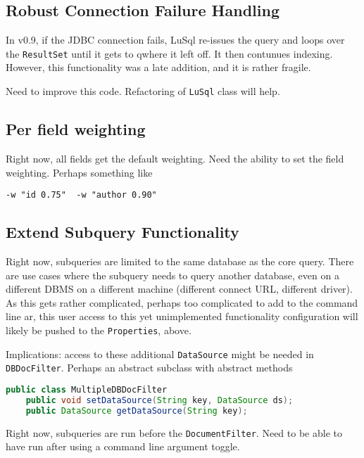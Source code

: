 \subsection{Robust Connection Failure Handling}
In v0.9, if the JDBC connection fails, LuSql re-issues the query and loops
over the {\tt ResultSet} until it gets to qwhere it left off.
It then contunues indexing.
However, this functionality was a late addition, and it is rather fragile.

Need to improve this code.
Refactoring of {\tt LuSql} class will help.

\subsection{Per field weighting}
Right now, all fields get the default weighting. 
Need the ability to set the field weighting.
Perhaps something like
\begin{lstlisting}[backgroundcolor=\color{grey}]
-w "id 0.75"  -w "author 0.90"
\end{lstlisting}



\subsection{Extend Subquery Functionality}
\begin{mlist}

\item Right now, subqueries are limited to the same database as the core query.
There are use cases where the subquery needs to query another database, even
on a different DBMS on a different machine (different connect URL, different
driver).
As this gets rather complicated, perhaps too complicated to add to the command
line ar, this user access to this yet unimplemented functionality
configuration will likely be pushed to the {\tt Properties}, above.

Implications: access to these additional {\tt DataSource} might be needed in
{\tt DBDocFilter}. Perhaps an abstract subclass with abstract methods
\begin{lstlisting}[backgroundcolor=\color{grey},language=Java]
public class MultipleDBDocFilter
    public void setDataSource(String key, DataSource ds);
    public DataSource getDataSource(String key);
\end{lstlisting}


\item Right now, subqueries are run before the {\tt DocumentFilter}. 
Need to be able to have run after using a command line argument toggle.

\end{mlist}

